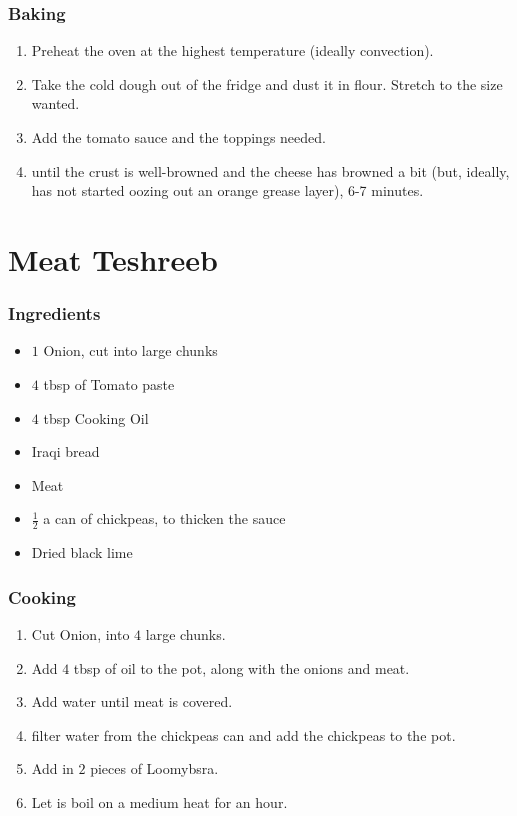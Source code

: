 \subsubsection{Baking}
\begin{enumerate}
    \item Preheat the oven at the highest temperature (ideally convection).
    \item Take the cold dough out of the fridge and dust it in flour. Stretch to the size wanted.
    \item Add the tomato sauce and the toppings needed.
    \item until the crust is well-browned and the cheese has browned a bit (but, ideally, has not started oozing out an orange grease layer), 6-7 minutes.
\end{enumerate}

\section{Meat Teshreeb}
\subsubsection{Ingredients}
\begin{itemize}
    \item $1$ Onion, cut into large chunks
    \item $4$ tbsp of Tomato paste
    \item $4$ tbsp Cooking Oil
    \item Iraqi bread
    \item Meat
    \item $\frac{1}{2}$ a can of chickpeas, to thicken the sauce
    \item Dried black lime
\end{itemize}

\subsubsection{Cooking}
\begin{enumerate}
    \item Cut Onion, into $4$ large chunks.
    \item Add $4$ tbsp of oil to the pot, along with the onions and meat.
    \item Add water until meat is covered.
    \item filter water from the chickpeas can and add the chickpeas to the pot.
    \item Add in $2$ pieces of Loomybsra.
    \item Let is boil on a medium heat for an hour.
\end{enumerate}

